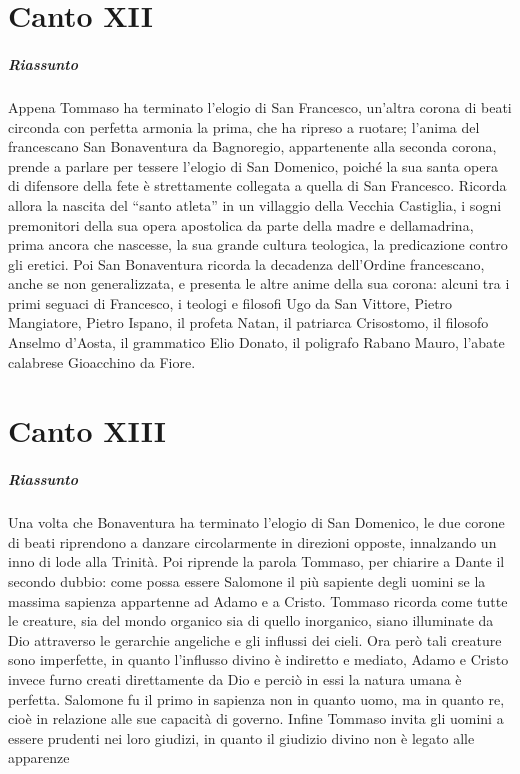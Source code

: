\documentclass[a4paper, twoside, titlepage]{book}
\begin{document}
\chapter{Canto XII}

\paragraph{Riassunto} Appena Tommaso ha terminato l'elogio di San Francesco, un'altra corona di beati circonda con perfetta armonia la prima, che ha ripreso a ruotare; l'anima del francescano San Bonaventura da Bagnoregio, appartenente alla seconda corona, prende a parlare per tessere l'elogio di San Domenico, poiché la sua santa opera di difensore della fete è strettamente collegata a quella di San Francesco. Ricorda allora la nascita del ``santo atleta'' in un villaggio della Vecchia Castiglia, i sogni premonitori della sua opera apostolica da parte della madre e dellamadrina, prima ancora che nascesse, la sua grande cultura teologica, la predicazione contro gli eretici. Poi San Bonaventura ricorda la decadenza dell'Ordine francescano, anche se non generalizzata, e presenta le altre anime della sua corona: alcuni tra i primi seguaci di Francesco, i teologi e filosofi Ugo da San Vittore, Pietro Mangiatore, Pietro Ispano, il profeta Natan, il patriarca Crisostomo, il filosofo Anselmo d'Aosta, il grammatico Elio Donato, il poligrafo Rabano Mauro, l'abate calabrese Gioacchino da Fiore.

\chapter{Canto XIII}

\paragraph{Riassunto} Una volta che Bonaventura ha terminato l'elogio di San Domenico, le due corone di beati riprendono a danzare circolarmente in direzioni opposte, innalzando un inno di lode alla Trinità. Poi riprende la parola Tommaso, per chiarire a Dante il secondo dubbio: come possa essere Salomone il più sapiente degli uomini se la massima sapienza appartenne ad Adamo e a Cristo. Tommaso ricorda come tutte le creature, sia del mondo organico sia di quello inorganico, siano illuminate da Dio attraverso le gerarchie angeliche e gli influssi dei cieli. Ora però tali creature sono imperfette, in quanto l'influsso divino è indiretto e mediato, Adamo e Cristo invece furno creati direttamente da Dio e perciò in essi la natura umana è perfetta. Salomone fu il primo in sapienza non in quanto uomo, ma in quanto re, cioè in relazione alle sue capacità di governo. Infine Tommaso invita gli uomini a essere prudenti nei loro giudizi, in quanto il giudizio divino non è legato alle apparenze 
\end{document}

